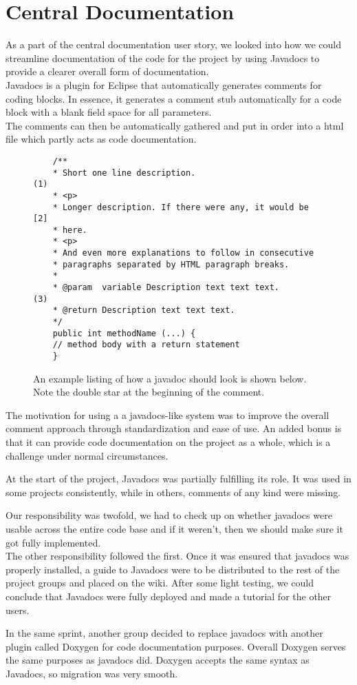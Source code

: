 \section{Central Documentation} \label{Sprint1_SecJavadocs}
As a part of the central documentation user story, we looked into how we could streamline documentation of the code for the project by using Javadocs to provide a clearer overall form of documentation.\\
Javadocs is a plugin for Eclipse that automatically generates comments for coding blocks. In essence, it generates a comment stub automatically for a code block with a blank field space for all parameters.\\
The comments can then be automatically gathered and put in order into a html file which partly acts as code documentation.\\
\begin{figure}[H]
	\begin{lstlisting}
	/**
	* Short one line description.                           (1)
	* <p>
	* Longer description. If there were any, it would be    [2]
	* here.
	* <p>
	* And even more explanations to follow in consecutive
	* paragraphs separated by HTML paragraph breaks.
	*
	* @param  variable Description text text text.          (3)
	* @return Description text text text.
	*/
	public int methodName (...) {
	// method body with a return statement
	}
	\end{lstlisting}
	\caption{An example listing of how a javadoc should look is shown below. Note the double star at the beginning of the comment.}
	\label{javadocsExample}
\end{figure}

The motivation for using a a javadocs-like system was to improve the overall comment approach through standardization and ease of use. An added bonus is that it can provide code documentation on the project as a whole, which is a challenge under normal circumstances.

At the start of the project, Javadocs was partially fulfilling its role. It was used in some projects consistently, while in others, comments of any kind were missing.

Our responsibility was twofold, we had to check up on whether javadocs were usable across the entire code base and if it weren’t, then we should make sure it got fully implemented.\\
The other responsibility followed the first. Once it was ensured that javadocs was properly installed, a guide to Javadocs were to be distributed to the rest of the project groups and placed on the wiki.
After some light testing, we could conclude that Javadocs were fully deployed and made a tutorial for the other users.

In the same sprint, another group decided to replace javadocs with another plugin called Doxygen for code documentation purposes. Overall Doxygen serves the same purposes as javadocs did.
Doxygen accepts the same syntax as Javadocs, so migration was very smooth.
